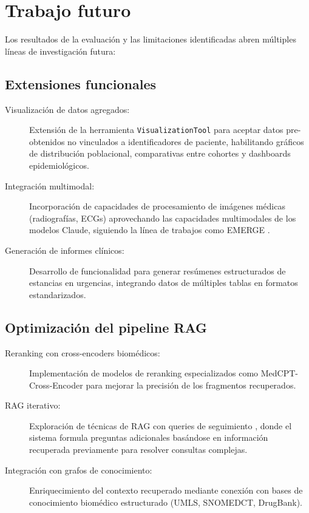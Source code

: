 \section{Trabajo futuro}
\label{sec:trabajo_futuro}

Los resultados de la evaluación y las limitaciones identificadas abren múltiples líneas de investigación futura:

\subsection{Extensiones funcionales}

\begin{description}
    \item[Visualización de datos agregados:] Extensión de la herramienta \texttt{VisualizationTool} para aceptar datos pre-obtenidos no vinculados a identificadores de paciente, habilitando gráficos de distribución poblacional, comparativas entre cohortes y dashboards epidemiológicos.
    
    \item[Integración multimodal:] Incorporación de capacidades de procesamiento de imágenes médicas (radiografías, ECGs) aprovechando las capacidades multimodales de los modelos Claude, siguiendo la línea de trabajos como EMERGE \parencite{zhu2024emerge}.
    
    \item[Generación de informes clínicos:] Desarrollo de funcionalidad para generar resúmenes estructurados de estancias en urgencias, integrando datos de múltiples tablas en formatos estandarizados.
\end{description}

\subsection{Optimización del pipeline RAG}

\begin{description}
    \item[Reranking con cross-encoders biomédicos:] Implementación de modelos de reranking especializados como MedCPT-Cross-Encoder \parencite{jin2023medcpt} para mejorar la precisión de los fragmentos recuperados.
    
    \item[\ac{RAG} iterativo:] Exploración de técnicas de \ac{RAG} con queries de seguimiento \parencite{xiong2024imedrag}, donde el sistema formula preguntas adicionales basándose en información recuperada previamente para resolver consultas complejas.
    
    \item[Integración con grafos de conocimiento:] Enriquecimiento del contexto recuperado mediante conexión con bases de conocimiento biomédico estructurado (\ac{UMLS}, \ac{SNOMEDCT}, DrugBank).
\end{description}

